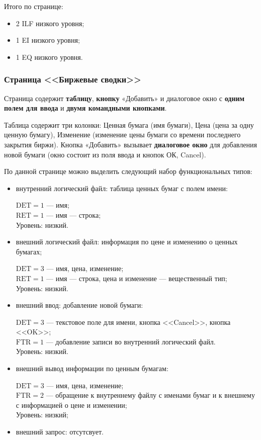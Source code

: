 Итого по странице:

\begin{itemize}
    \item 2 ILF низкого уровня;
    \item 1 EI низкого уровня;
    \item 1 EQ низкого уровня.
\end{itemize}

\subsubsection{Страница <<Биржевые сводки>>}

Страница содержит \textbf{таблицу}, \textbf{кнопку} «Добавить» и диалоговое окно с \textbf{одним полем для ввода} и \textbf{двумя командными кнопками}.

Таблица содержит три колонки: Ценная бумага (имя бумаги), Цена (цена за одну ценную бумагу), Изменение (изменение цены бумаги со времени последнего закрытия биржи). Кнопка «Добавить» вызывает \textbf{диалоговое окно} для добавления новой бумаги (окно состоит из поля ввода и кнопок ОК, Cancel).

По данной странице можно выделить следующий набор функциональных типов:

\begin{itemize}
    \item внутренний логический файл: таблица ценных бумаг с полем имени:
    
        $\text{DET} = 1$ --- имя;\\
        $\text{RET} = 1$ --- имя --- строка;\\
        Уровень: низкий.
        
    \item внешний логический файл: информация по цене и изменению о ценных бумагах;

        $\text{DET} = 3$ --- имя, цена, изменение;\\
        $\text{RET} = 1$ --- имя --- строка, цена и изменение --- вещественный тип;\\
        Уровень: низкий.
        
    \item внешний ввод: добавление новой бумаги:
    
        $\text{DET} = 3$ --- текстовое поле для имени, кнопка <<Cancel>>, кнопка <<OK>>; \\
        $\text{FTR} = 1$ --- добавление записи во внутренний логический файл.\\
        Уровень: низкий.
        
    \item внешний вывод информации по ценным бумагам:
    
        $\text{DET} = 3$ --- имя, цена, изменение; \\
        $\text{FTR} = 2$ --- обращение к внутреннему файлу с именами бумаг и к внешнему с информацией о цене и изменении;\\
        Уровень: низкий;
        
    \item внешний запрос: отсутсвует.
\end{itemize}

